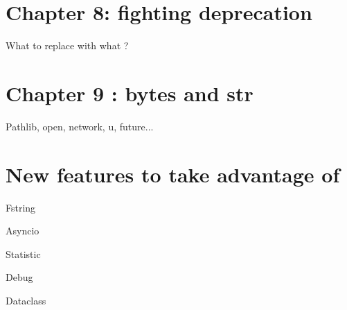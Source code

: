 \documentclass[paperwidth=8in, paperheight=10in,lang=en]{elegantbook}
\begin{document}
\chapter{Chapter 8: fighting deprecation}

What to replace with what ?

\chapter{Chapter 9 : bytes and str}

Pathlib, open, network, u, future...

\chapter{New features to take advantage of}\label{chap:new_features}


Fstring

Asyncio

Statistic

Debug

Dataclass

\appendix

\printglossaries

\backmatter %


\end{document}
